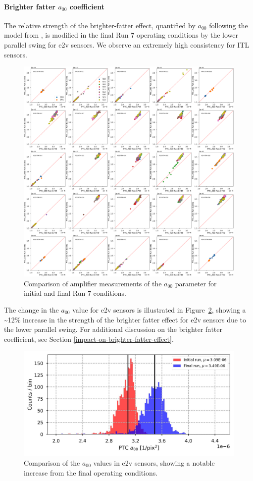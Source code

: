 \paragraph{Brighter fatter $a_{00}$ coefficient}\label{final-brighter-fatter-a00-coefficient}

The relative strength of the brighter-fatter effect, quantified by $a_{00}$ following the model from \cite{2019A&A...629A..36A}, is modified in the final Run 7 operating conditions by the lower parallel swing for e2v sensors. We observe an extremely high consistency for ITL sensors.

\begin{figure}[ht]
    \centering
    \includegraphics[width=0.7\linewidth]{figures/finalCharacterization/E749_E1881_PTC_A00.png}
    \caption{Comparison of amplifier measurements of the $a_{00}$ parameter for initial and final Run 7 conditions.}
    \label{fig:finalChar-PTC_A00_5x5}
\end{figure}

The change in the $a_{00}$ value for e2v sensors is illustrated in Figure~\ref{fig:finalChar-PTC_A00_E2VComp}, showing a \textasciitilde12\% increase in the strength of the brighter fatter effect for e2v sensors due to the lower parallel swing. For additional discussion on the brighter fatter coefficient, see Section \ref{impact-on-brighter-fatter-effect}.

\begin{figure}[ht]
    \centering
    \includegraphics[width=0.7\linewidth]{figures/finalCharacterization/PTCA00Comp.jpg}
    \caption{Comparison of the $a_{00}$ values in e2v sensors, showing a notable increase from the final operating conditions.}
    \label{fig:finalChar-PTC_A00_E2VComp}
\end{figure}

